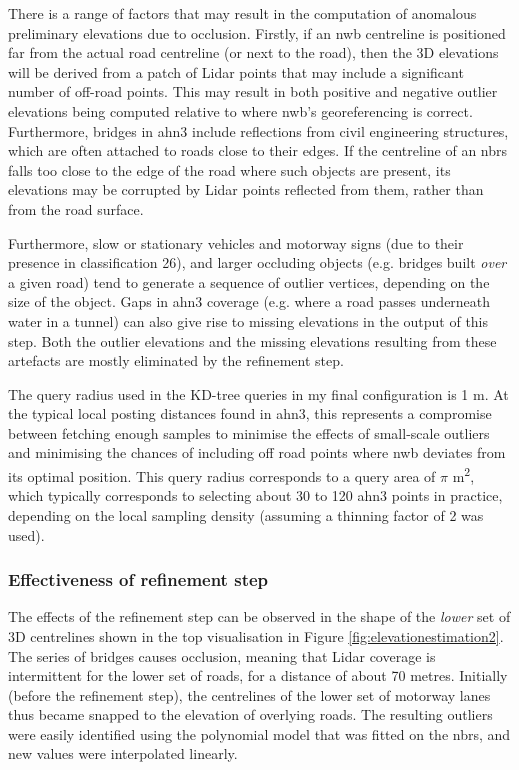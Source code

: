 There is a range of factors that may result in the computation of anomalous preliminary elevations due to occlusion. Firstly, if an \ac{nwb} centreline is positioned far from the actual road centreline (or next to the road), then the 3D elevations will be derived from a patch of Lidar points that may include a significant number of off-road points. This may result in both positive and negative outlier elevations being computed relative to where \ac{nwb}'s georeferencing is correct. Furthermore, bridges in \ac{ahn3} include reflections from civil engineering structures, which are often attached to roads close to their edges. If the centreline of an \ac{nbrs} falls too close to the edge of the road where such objects are present, its elevations may be corrupted by Lidar points reflected from them, rather than from the road surface.

Furthermore, slow or stationary vehicles and motorway signs (due to their presence in classification 26), and larger occluding objects (e.g. bridges built \textit{over} a given road) tend to generate a sequence of outlier vertices, depending on the size of the object. Gaps in \ac{ahn3} coverage (e.g. where a road passes underneath water in a tunnel) can also give rise to missing elevations in the output of this step. Both the outlier elevations and the missing elevations resulting from these artefacts are mostly eliminated by the refinement step.

The query radius used in the KD-tree queries in my final configuration is 1 m. At the typical local posting distances found in \ac{ahn3}, this represents a compromise between fetching enough samples to minimise the effects of small-scale outliers and minimising the chances of including off road points where \ac{nwb} deviates from its optimal position. This query radius corresponds to a query area of $\pi$ m\textsuperscript{2}, which typically corresponds to selecting about 30 to 120 \ac{ahn3} points in practice, depending on the local sampling density (assuming a thinning factor of 2 was used).

\subsubsection{Effectiveness of refinement step}

The effects of the refinement step can be observed in the shape of the \textit{lower} set of 3D centrelines shown in the top visualisation in Figure \ref{fig:elevationestimation2}. The series of bridges causes occlusion, meaning that Lidar coverage is intermittent for the lower set of roads, for a distance of about 70 metres. Initially (before the refinement step), the centrelines of the lower set of motorway lanes thus became snapped to the elevation of overlying roads. The resulting outliers were easily identified using the polynomial model that was fitted on the \ac{nbrs}, and new values were interpolated linearly.

